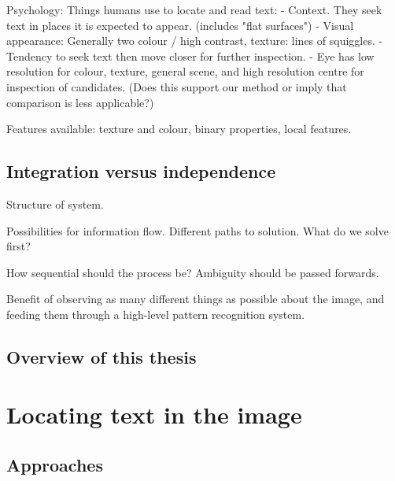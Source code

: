 Psychology:  Things humans use to locate and read text:
	- Context.  They seek text in places it is expected to appear.  (includes "flat surfaces")
	- Visual appearance:  Generally two colour / high contrast, texture: lines of squiggles.
	- Tendency to seek text then move closer for further inspection.
	- Eye has low resolution for colour, texture, general scene, and high resolution centre for inspection of candidates.  (Does this support our method or imply that comparison is less applicable?)

Features available: texture and colour, binary properties, local features.



\section{Integration versus independence} %


Structure of system.

Possibilities for information flow.  Different paths to solution.  What do we solve first?

How sequential should the process be?  Ambiguity should be passed forwards.

Benefit of observing as many different things as possible about the image, and feeding them through a high-level pattern recognition system.



\section{Overview of this thesis} %




\chapter{Locating text in the image}


\section{Approaches} %

